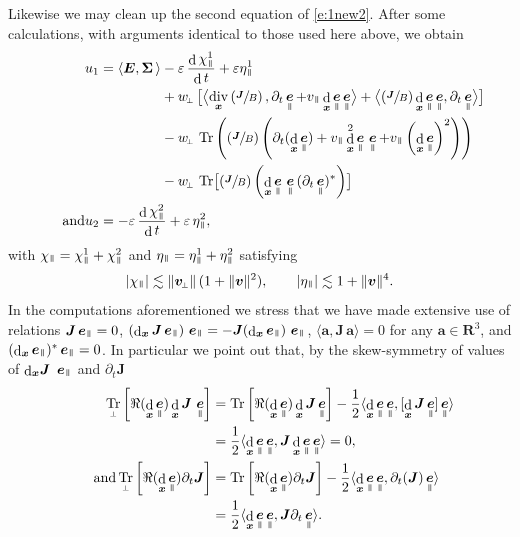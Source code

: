 \documentclass[JEP,XML,SOM,Unicode]{cedram}
\newcommand{\sperp}{{\scriptscriptstyle\perp}}
\newcommand{\blangle}{\bigl\langle}
\newcommand{\brangle}{\bigr\rangle}
\newcommand{\Psfrac}[2]{(\sfrac{#1}{#2})}
\let\eps\varepsilon
\let\d\partial
\DeclareMathOperator\dD{d}\let\dd\dD
\DeclareMathOperator{\Tr}{Tr}
\DeclareMathOperator{\Div}{div}
\theoremstyle{plain}
\theoremstyle{definition}
\newcommand{\be}{\begin{equation}}
\newcommand{\ee}{\end{equation}}
\newcommand\R{\mathbf R}
\newcommand\bE{{\boldsymbol E}}
\newcommand\bJ{{\boldsymbol J}}
\newcommand\bfa{{\boldsymbol a}}
\newcommand\bfv{{\boldsymbol v}}
\newcommand\bfx{{\boldsymbol x}}
\newcommand\Sig{{\boldsymbol \Sigma}}
\DeclareMathOperator{\beD}{\boldsymbol{e}}
\newcommand\eDpar{\beD_\mypar}
\newcommand\vpar{v_\mypar}
\newcommand\bvperp{\bfv_{\!\sperp}}
\newcommand\eperp{w_{\!\sperp}}
\newcommand{\Trperp}[1]{\Tr_\sperp^{#1}}
\newcommand{\mypar}{{\mkern3mu\vphantom{\perp}\vrule depth 0pt\mkern2mu\vrule depth 0pt\mkern3mu}}
\begin{document}
Likewise we may clean up the second equation of \eqref{e:1new2}. After some calculations, with arguments identical to those used here above, we obtain
\begin{align*}
u_1 &= \langle\bE,\Sig\,\rangle-\eps\,\frac{\dD\chi_\mypar^1}{\dD t}+\eps\eta_\mypar^1\\
&\hphantom{{}= \langle\bE,\Sig\,\rangle}
+ \eperp \,\bigl[ \blangle\Div_\bfx\left(\sfrac{\bJ}{B}\right),
\d_t\eDpar+\vpar\dD_\bfx\eDpar\eDpar\brangle +\blangle\Psfrac{\bJ}{B}\dD_\bfx\eDpar\eDpar,\d_t\eDpar\brangle \bigr]
\\
&\hphantom{{}= \langle\bE,\Sig\,\rangle}
-\eperp\,\Tr\left(\Psfrac{\bJ}{B}\left(\d_t(\dD_\bfx\eDpar)+\vpar\dD_{\bfx}^2\eDpar\,\eDpar+\vpar\left(\dD_{\bfx}\eDpar\right)^2\right)\right)\\
&\hphantom{{}= \langle\bE,\Sig\,\rangle}
- \eperp\,\Tr\bigl[\Psfrac{\bJ}{B}\left(\dD_\bfx\eDpar\,\eDpar\,(\d_t\eDpar)^*\right)\bigr]\\
\tag*{and}
u_2 &=-\eps\,\frac{\dD\chi^2_\mypar}{\dD t}+\eps\,\eta^2_\mypar,
\end{align*}
with $\chi_\mypar = \chi_\mypar^1+\chi_\mypar^2$ and $\eta_\mypar=\eta_\mypar^1+\eta_\mypar^2$ satisfying
\be\label{par-remainders}
|\chi_\mypar|\lesssim \|\bvperp\|\,(1+\|\bfv\|^2),\qquad
|\eta_\mypar|\lesssim 1+\|\bfv\|^4.
\ee
In the computations aforementioned we stress that we have made extensive use of relations $\bJ\eDpar=0$, $\left(\dD_\bfx\bJ\eDpar\right)\,\eDpar=-\bJ (\dD_\bfx\eDpar)\,
\eDpar$, $\langle \bfa, \bJ\,\bfa\rangle=0$ for
any $\bfa\in\R^3$, and $(\dD_\bfx\eDpar)^*\eDpar=0$. In particular we point out that, by the skew-symmetry of values of $\dD_{\bfx}\!\bJ\ \eDpar$ and $\d_t\bJ$
\begin{align*}
\Trperp{}\left[\Re(\dD_{\bfx}\eDpar)\dD_{\bfx}\bJ\,\eDpar\right]
&=\Tr\left[\Re(\dD_{\bfx}\eDpar)\dD_{\bfx}\bJ\eDpar\right]
-\frac12\langle\dD_{\bfx}\eDpar\eDpar,[\dD_{\bfx}\bJ\eDpar]\eDpar\rangle
\\
&=\frac12\langle\dD_{\bfx}\eDpar\eDpar,\bJ\dD_{\bfx}\eDpar\eDpar\rangle
=0,\\
\tag*{and}
\Trperp{}\left[\Re(\dD_{\bfx}\eDpar)\d_t\bJ\right]
&=\Tr\left[\Re(\dD_{\bfx}\eDpar)\d_t\bJ\right]
-\frac12\langle\dD_{\bfx}\eDpar\eDpar,\d_t(\bJ)\eDpar\rangle\\
&=\frac12\langle\dD_{\bfx}\eDpar\eDpar,\bJ\d_t\eDpar\rangle.
\end{align*}
\end{document}
